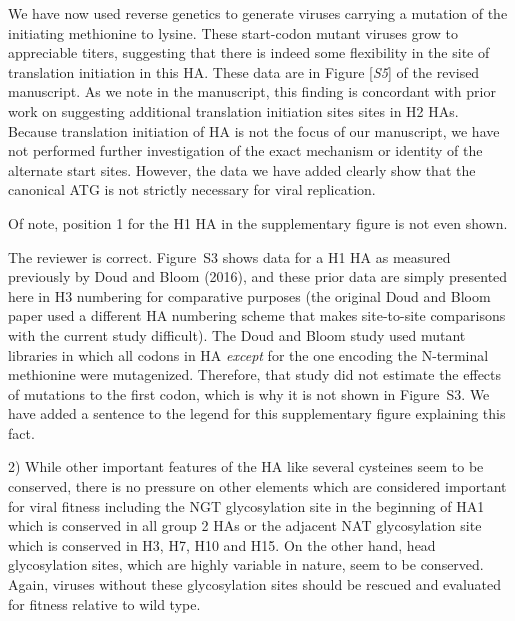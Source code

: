\documentclass[11pt, oneside]{article}   	%
\newcommand{\comment}[1]{{\color{red}[\textsl{#1}]}}
\newcommand{\response}[1]{{\color{black}#1}}
\begin{document}
\response{
We have now used reverse genetics to generate viruses carrying a mutation of the initiating methionine to lysine.
These start-codon mutant viruses grow to appreciable titers, suggesting that there is indeed some flexibility in the site of translation initiation in this HA.
These data are in Figure \comment{S5} of the revised manuscript.
As we note in the manuscript, this finding is concordant with prior work on suggesting additional translation initiation sites sites in H2 HAs.
Because translation initiation of HA is not the focus of our manuscript, we have not performed further investigation of the exact mechanism or identity of the alternate start sites.
However, the data we have added clearly show that the canonical ATG is not strictly necessary for viral replication.
}

Of note, position 1 for the H1 HA in the supplementary figure is not even shown. 

\response{
The reviewer is correct. 
Figure~S3 shows data for a H1 HA as measured previously by Doud and Bloom (2016), and these prior data are simply presented here in H3 numbering for comparative purposes (the original Doud and Bloom paper used a different HA numbering scheme that makes site-to-site comparisons with the current study difficult). 
The Doud and Bloom study used mutant libraries in which all codons in HA \emph{except} for the one encoding the N-terminal methionine were mutagenized.
Therefore, that study did not estimate the effects of mutations to the first codon, which is why it is not shown in Figure~S3.
We have added a sentence to the legend for this supplementary figure explaining this fact.
}

2) While other important features of the HA like several cysteines seem to be conserved, there is no pressure on other elements which are considered important for viral fitness including the NGT glycosylation site in the beginning of HA1 which is conserved in all group 2 HAs or the adjacent NAT glycosylation site which is conserved in H3, H7, H10 and H15. On the other hand, head glycosylation sites, which are highly variable in nature, seem to be conserved. Again, viruses without these glycosylation sites should be rescued and evaluated for fitness relative to wild type. 
\end{document}
